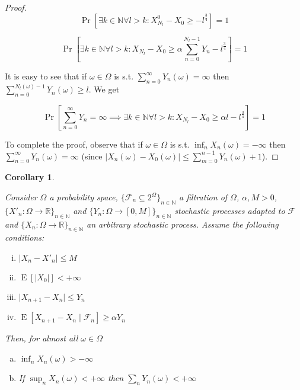 \documentclass[11pt]{article}
\theoremstyle{definition}
\theoremstyle{plain}
\newtheorem{corollary}{Corollary}%
\newcommand{\Nats}{\mathbb{N}}
\newcommand{\Reals}{\mathbb{R}}
\newcommand{\A}[1]{\lvert #1 \rvert}
\newcommand{\Sq}[2]{\{#1\}_{#2 \in \Nats}}
\newcommand{\Sqn}[1]{\Sq{#1}{n}}
\DeclareMathOperator{\E}{E}
\newcommand{\F}{\mathcal{F}}
\begin{document}
\begin{proof}
$$\Pr\left[\exists k \in \Nats \forall l > k: X^0_{N_l} - X_0 \geq -l^{\frac{3}{4}}\right] = 1$$

$$\Pr\left[\exists k \in \Nats \forall l > k: X_{N_l} - X_0 \geq \alpha \sum_{n=0}^{N_l - 1} Y_n - l^{\frac{3}{4}}\right] = 1$$


It is easy to see that if $\omega \in \Omega$ is s.t. $\sum_{n=0}^\infty Y_n\left(\omega\right) = \infty$ then $\sum_{n=0}^{N_l\left(\omega\right) - 1} Y_n\left(\omega\right) \geq l$. We get

$$\Pr\left[\sum_{n=0}^\infty  Y_n = \infty \implies \exists k \in \Nats \forall l > k: X_{N_l} - X_0 \geq \alpha l - l^{\frac{3}{4}}\right]=1$$

To complete the proof, observe that if ${\omega \in \Omega}$ is s.t. ${\inf_n X_n\left(\omega\right) = -\infty}$ then ${\sum_{n=0}^\infty  Y_n\left(\omega\right) = \infty}$ (since ${\A{X_n\left(\omega\right) - X_0\left(\omega\right)} \leq \sum_{m=0}^{n-1} Y_n\left(\omega\right) + 1}$).
\end{proof}

\begin{samepage}
\begin{corollary}
\label{crl:prudent}

Consider $\Omega$ a probability space, $\Sqn{\F_n \subseteq 2^\Omega}$ a filtration of $\Omega$, $\alpha,M > 0$, $\Sqn{X'_n: \Omega \rightarrow \Reals}$ and $\Sqn{Y_n: \Omega \rightarrow \left[0,M\right]}$ stochastic processes adapted to $\F$ and $\Sqn{X_n: \Omega \rightarrow \Reals}$ an arbitrary stochastic process. Assume the following conditions:

\begin{enumerate}[i.]

\item $\A{X_n - X'_n} \leq M$
\item $\E\left[\A{X_0}\right] < +\infty$
\item $\A{X_{n+1} - X_n} \leq Y_n$
\item $\E\left[X_{n+1} - X_n \mid \F_n\right] \geq \alpha Y_n$

\end{enumerate}

Then, for almost all $\omega \in \Omega$

\begin{enumerate}[a.]

\item\label{itm:crl_prudent__inf} $\inf_n X_n\left(\omega\right) > -\infty$
\item\label{itm:crl_prudent__sup} If $\sup_n X_n\left(\omega\right) < +\infty$ then $\sum_n Y_n\left(\omega\right) < +\infty$

\end{enumerate}

\end{corollary}
\end{samepage}
\end{document}
